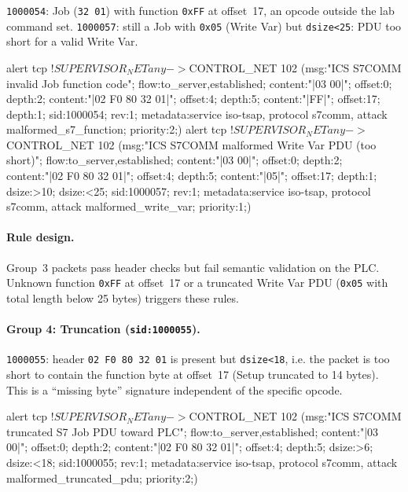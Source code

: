 \documentclass[../main.tex]{subfiles}
\begin{document}
\texttt{1000054}: Job (\texttt{32 01}) with function \texttt{0xFF} at offset~17, an opcode outside the lab command set. \texttt{1000057}: still a Job with \texttt{0x05} (Write Var) but \texttt{dsize<25}: PDU too short for a valid Write Var.

\begin{packetdump}
alert tcp !$SUPERVISOR_NET any -> $CONTROL_NET 102 (msg:"ICS S7COMM invalid Job function code";
  flow:to_server,established; content:"|03 00|"; offset:0; depth:2;
  content:"|02 F0 80 32 01|"; offset:4; depth:5; content:"|FF|"; offset:17;
  depth:1; sid:1000054; rev:1; metadata:service iso-tsap, protocol s7comm,
  attack malformed_s7_function; priority:2;)
alert tcp !$SUPERVISOR_NET any -> $CONTROL_NET 102 (msg:"ICS S7COMM malformed Write Var PDU (too short)";
  flow:to_server,established; content:"|03 00|"; offset:0; depth:2;
  content:"|02 F0 80 32 01|"; offset:4; depth:5; content:"|05|"; offset:17;
  depth:1; dsize:>10; dsize:<25; sid:1000057; rev:1;
  metadata:service iso-tsap, protocol s7comm, attack malformed_write_var;
  priority:1;)
\end{packetdump}

\paragraph{Rule design.}
Group~3 packets pass header checks but fail semantic validation on the PLC. Unknown function \texttt{0xFF} at offset~17 or a truncated Write Var PDU (\texttt{0x05} with total length below 25 bytes) triggers these rules.

\paragraph{Group 4: Truncation (\texttt{sid:1000055}).}

\texttt{1000055}: header \texttt{02 F0 80 32 01} is present but \texttt{dsize<18}, i.e. the packet is too short to contain the function byte at offset~17 (Setup truncated to 14 bytes). This is a ``missing byte'' signature independent of the specific opcode.

\begin{packetdump}
alert tcp !$SUPERVISOR_NET any -> $CONTROL_NET 102 (msg:"ICS S7COMM truncated S7 Job PDU toward PLC";
  flow:to_server,established; content:"|03 00|"; offset:0; depth:2;
  content:"|02 F0 80 32 01|"; offset:4; depth:5; dsize:>6; dsize:<18;
  sid:1000055; rev:1; metadata:service iso-tsap, protocol s7comm,
  attack malformed_truncated_pdu; priority:2;)
\end{packetdump}
\end{document}

